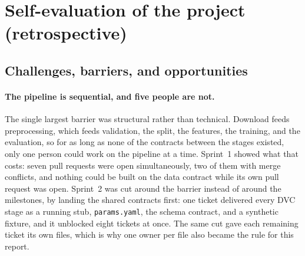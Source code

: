 \section{Self-evaluation of the project (retrospective)}
\label{sec:retrospective}


\subsection{Challenges, barriers, and opportunities}
\label{sec:retro-challenges}

\paragraph{The pipeline is sequential, and five people are not.}
The single largest barrier was structural rather than technical.
Download feeds preprocessing, which feeds validation, the split, the features, the training, and the evaluation, so for as long as none of the contracts between the stages existed, only one person could work on the pipeline at a time.
Sprint~1 showed what that costs: seven pull requests were open simultaneously, two of them with merge conflicts, and nothing could be built on the data contract while its own pull request was open.
Sprint~2 was cut around the barrier instead of around the milestones, by landing the shared contracts first: one ticket delivered every DVC stage as a running stub, \texttt{params.yaml}, the schema contract, and a synthetic fixture, and it unblocked eight tickets at once.
The same cut gave each remaining ticket its own files, which is why one owner per file also became the rule for this report.

